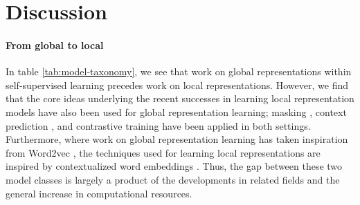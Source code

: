 \section{Discussion}
\label{sec:mtax}




\paragraph{From global to local} 

In table \ref{tab:model-taxonomy}, we see that work on global representations within self-supervised learning precedes work on local representations. However, we find that the core ideas underlying the recent successes in learning local representation models have also been used for global representation learning; masking \cite{chung2016audio}, context prediction \cite{chung2018speech2vec}, and contrastive training \cite{milde2018unspeech} have been applied in both settings. Furthermore, where work on global representation learning has taken inspiration from Word2vec \cite{mikolov2013distributed}, the techniques used for learning local representations are inspired by contextualized word embeddings \cite{devlin2019bert}. Thus, the gap between these two model classes is largely a product of the developments in related fields and the general increase in computational resources.



